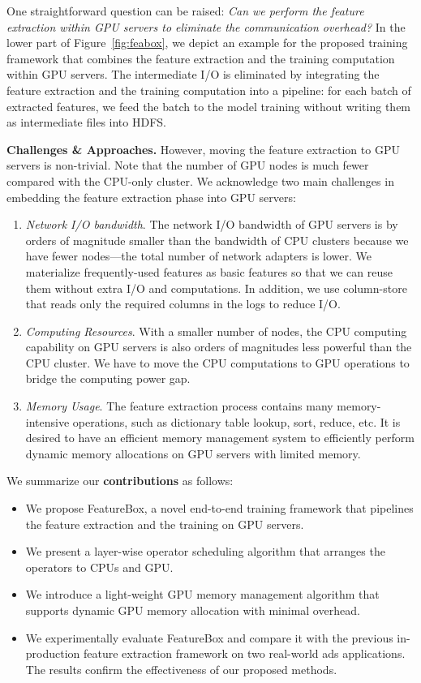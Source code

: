 \documentclass[sigconf]{acmart}
\begin{document}
One straightforward question can be raised: \textit{Can we perform the feature extraction within GPU servers to eliminate the communication overhead?} 
In the lower part of Figure~\ref{fig:feabox}, we depict an example for the proposed training framework that combines the feature extraction and the training computation within GPU servers. The intermediate I/O is eliminated by integrating the feature extraction and the training computation into a pipeline: for each batch of extracted features, we feed the batch to the model training without writing them as intermediate files into HDFS.

\textbf{Challenges \& Approaches.} 
However, moving the feature extraction to GPU servers is non-trivial. 
Note that the number of GPU nodes is much fewer compared with the CPU-only cluster. We acknowledge two main challenges in embedding the feature extraction phase into GPU servers:
\begin{enumerate}
\item {\it Network I/O bandwidth}. The network I/O bandwidth of GPU servers is by orders of magnitude smaller than the bandwidth of CPU clusters because we have fewer nodes---the total number of network adapters is lower. We materialize frequently-used features as basic features so that we can reuse them without extra I/O and computations. In addition, we use column-store that reads only the required columns in the logs to reduce I/O.
\item {\it Computing Resources}. With a smaller number of nodes, the CPU computing capability on GPU servers is also orders of magnitudes less powerful than the CPU cluster. We have to move the CPU computations to GPU operations to bridge the computing power gap.
\item {\it Memory Usage}. The feature extraction process contains many memory-intensive operations, such as dictionary table lookup, sort, reduce, etc. It is desired to have an efficient memory management system to efficiently perform dynamic memory allocations on GPU servers with limited memory.
\end{enumerate}


We summarize our \textbf{contributions} as follows:
\begin{itemize}
\item We propose FeatureBox, a novel end-to-end training framework that pipelines the feature extraction and the training on GPU servers.
\item We present a layer-wise operator scheduling algorithm that arranges the operators to CPUs and GPU.
\item We introduce a light-weight GPU memory management algorithm that supports dynamic GPU memory allocation with minimal overhead.
\item We experimentally evaluate FeatureBox and compare it with the previous in-production feature extraction framework on two real-world ads applications. The results confirm the effectiveness of our proposed methods.
\end{itemize}
\end{document}
